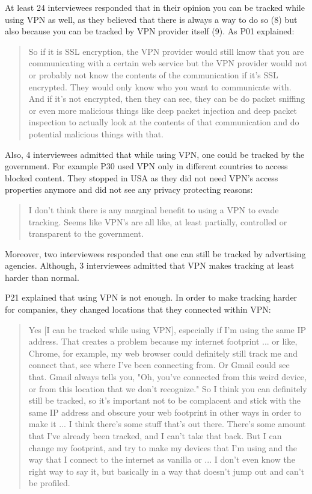At least 24 interviewees responded that in their opinion you can be tracked
while using VPN as well, as they believed that there is always a way to do so
(8) but also because you can be tracked by VPN provider itself (9). 
As P01 explained:

\begin{quote}So if it is SSL encryption, the VPN provider would still know
that you are communicating with a certain web service but the VPN provider
would not or probably not know the contents of the communication if it's SSL
encrypted. They would only know who you want to communicate with. And if it's
not encrypted, then they can see, they can be do packet sniffing or even more
malicious things like deep packet injection and deep packet inspection to
actually look at the contents of that communication and do potential malicious
things with that. \end{quote}

Also, 4 interviewees admitted that while using VPN, one could be tracked by
the government. For example P30 used VPN only in different countries to access
blocked content. They stopped in USA as they did not need VPN's access
properties anymore and did not see any privacy protecting reasons:

\begin{quote}I don't think there is any marginal benefit to using a VPN to
evade tracking. Seems like VPN's are all like, at least partially, controlled
or transparent to the government.\end{quote}

 Moreover, two interviewees responded that one can still be tracked by
 advertising agencies. Although, 3 interviewees admitted that VPN makes
 tracking at least harder than normal. 

P21 explained that using VPN is not enough. In order to make tracking harder
for companies, they changed locations that they connected within VPN:
\begin{quote}Yes [I can be tracked while using VPN], especially if I'm using
the same IP address. That creates a problem because my internet footprint ...
or like, Chrome, for example, my web browser could definitely still track me
and connect that, see where I've been connecting from. Or Gmail could see
that. Gmail always tells you, "Oh, you've connected from this weird device, or
from this location that we don't recognize." So I think you can definitely
still be tracked, so it's important not to be complacent and stick with the
same IP address and obscure your web footprint in other ways in order to make
it ... I think there's some stuff that's out there. There's some amount that
I've already been tracked, and I can't take that back. But I can change my
footprint, and try to make my devices that I'm using and the way that I
connect to the internet as vanilla or ... I don't even know the right way to
say it, but basically in a way that doesn't jump out and can't be
profiled.\end{quote}


